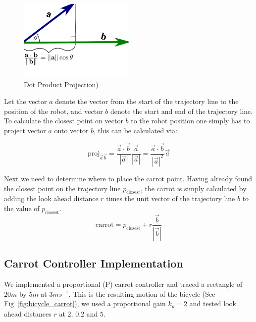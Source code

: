 \documentclass{article}
\begin{document}
\begin{figure}[H]
	\centering
	\includegraphics[width=0.5\textwidth]{images/dot_product_projection.png}
	\caption{Dot Product Projection)}
	\label{fig:dot_product_projection}
\end{figure}

Let the vector $a$ denote the vector from the start of the trajectory line to the position of the robot, and vector $b$ denote the start and end of the trajectory line. To calculate the closest point on vector $b$ to the robot position one simply has to project vector $a$ onto vector $b$, this can be calculated via:

\begin{equation}
	\text{proj}_{\vec{a}\vec{b}} 
		= \dfrac{\vec{a} \cdot \vec{b}}{|\vec{a}|}
			\dfrac{\vec{a}}{|\vec{a}|} 
		= \dfrac{\vec{a} \cdot \vec{b}}{|\vec{a}|^{2}}
			\vec{a}
\end{equation}

Next we need to determine where to place the carrot point. Having already found the closest point on the trajectory line $p_{\text{closest}}$, the carrot is simply calculated by adding the look ahead distance $r$ times the unit vector of the trajectory line $b$ to the value of $p_{\text{closest}}$.
\begin{equation}
	\text{carrot} = p_{\text{closest}} + r \dfrac{\vec{b}}{|\vec{b}|}
\end{equation}



\subsection{Carrot Controller Implementation}
We implemented a proportional (P) carrot controller and traced a rectangle of $20m$ by $5m$ at $3ms^{-1}$. This is the resulting motion of the bicycle (See Fig~\ref{fig:bicycle_carrot}), we used a proportional gain $k_{p} = 2$ and tested look ahead distances $r$ at $2$, $0.2$ and $5$. 
\end{document}
